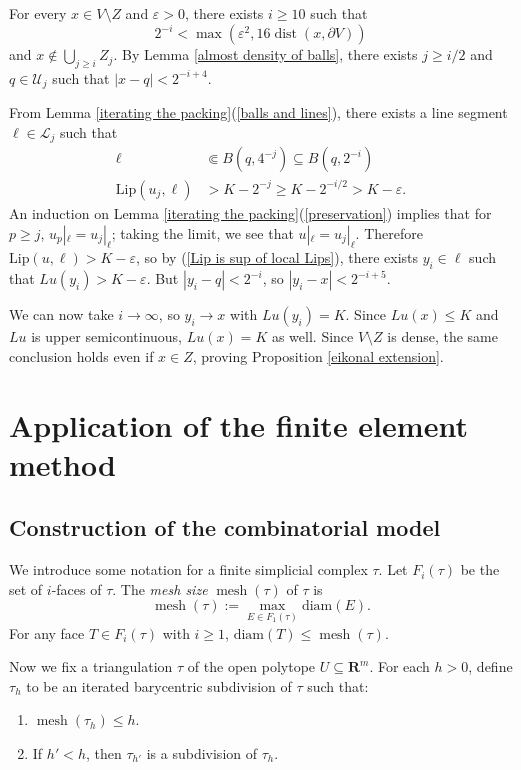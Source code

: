 \documentclass[reqno,11pt]{amsart}
\newcommand{\RR}{\mathbf{R}}
\DeclareMathOperator{\dist}{dist}
\DeclareMathOperator{\mesh}{mesh}
\newcommand{\diam}{\mathrm{diam}}
\newcommand{\Lip}{\mathrm{Lip}}
\newcommand{\dfn}[1]{\emph{#1}\index{#1}}
\theoremstyle{definition}
\numberwithin{equation}{section}
\begin{document}
For every $x \in V \setminus Z$ and $\varepsilon > 0$, there exists $i \geq 10$ such that
$$2^{-i} < \max(\varepsilon^2, 16 \dist(x, \partial V))$$
and $x \notin \bigcup_{j \geq i} Z_j$.
By Lemma \ref{almost density of balls}, there exists $j \geq i/2$ and $q \in \mathscr U_j$ such that $|x - q| < 2^{-i + 4}$.

From Lemma \ref{iterating the packing}(\ref{balls and lines}), there exists a line segment $\ell \in \mathscr L_j$ such that
\begin{align*}
\ell &\Subset B(q, 4^{-j}) \subseteq B(q, 2^{-i}) \\
\Lip(u_j, \ell) &> K - 2^{-j} \geq K - 2^{-i/2} > K - \varepsilon.
\end{align*}
An induction on Lemma \ref{iterating the packing}(\ref{preservation}) implies that for $p \geq j$, $u_p|_\ell = u_j|_\ell$; taking the limit, we see that $u|_\ell = u_j|_\ell$.
Therefore $\Lip(u, \ell) > K - \varepsilon$, so by (\ref{Lip is sup of local Lips}), there exists $y_i \in \ell$ such that $Lu(y_i) > K - \varepsilon$.
But $|y_i - q| < 2^{-i}$, so $|y_i - x| < 2^{-i + 5}$.

We can now take $i \to \infty$, so $y_i \to x$ with $Lu(y_i) = K$.
Since $Lu(x) \leq K$ and $Lu$ is upper semicontinuous, $Lu(x) = K$ as well.
Since $V \setminus Z$ is dense, the same conclusion holds even if $x \in Z$, proving Proposition \ref{eikonal extension}.



\section{Application of the finite element method}
\subsection{Construction of the combinatorial model}
We introduce some notation for a finite simplicial complex $\tau$.
Let $F_i(\tau)$ be the set of $i$-faces of $\tau$.
The \dfn{mesh size} $\mesh(\tau)$ of $\tau$ is 
$$\mesh(\tau) := \max_{E \in F_1(\tau)} \diam(E).$$
For any face $T \in F_i(\tau)$ with $i \geq 1$, $\diam(T) \leq \mesh(\tau)$.

Now we fix a triangulation $\tau$ of the open polytope $U \subseteq \RR^m$.
For each $h > 0$, define $\tau_h$ to be an iterated barycentric subdivision of $\tau$ such that:
\begin{enumerate}
\item $\mesh(\tau_h) \leq h$.
\item If $h' < h$, then $\tau_{h'}$ is a subdivision of $\tau_h$.
\end{enumerate}
\end{document}

